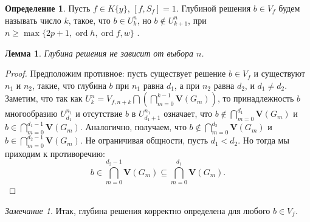 \documentclass[16pt]{article}
\DeclareMathOperator{\ord}{ord}
\renewcommand{\ge}{\geqslant} %
\theoremstyle{plain1}
\newtheorem{lemma}[theorem1]{Лемма}
\theoremstyle{plain2}
\theoremstyle{plain}
\theoremstyle{plain3}
\theoremstyle{definition}
\newtheorem{definition}[theorem2]{Определение}
\theoremstyle{remark}
\newtheorem{remark}[theorem1]{Замечание}
\begin{document}
\begin{definition}
Пусть $f\in K\{y\}$, $[f,S_f]=1$.  Глубиной решения $b\in {V}_f$  будем называть число $k$, такое, что $b\in {U}_k^n$, но $b\not\in {U}_{k+1}^n$, при $n \ge\max\{ 2p+1,\ord{h},\ord{f},w\}$ .
\end{definition}



\begin{lemma}\label{lemma:o_nasledovanii}
Глубина решения не зависит от выбора $n$.

\end{lemma}

\begin{proof}
Предположим противное: пусть существует решение $b\in{V}_f$ и существуют $n_1$ и $n_2$, такие, что глубина $b$ при $n_1$ равна $d_1$, а при $n_2$ равна $d_2$, и $d_1\not=d_2$. Заметим, что так как ${U}_k^n={V}_{f,n+k}\bigcap\left(\bigcap\limits_{m=0}^{k-1}\mathbf{V}\left(G_m\right)\right)$, то принадлежность $b$  многообразию ${U}_{d_1}^{n_1}$ и отсутствие $b$ в ${U}_{d_1+1}^{n_1}$ означает, что $b\not\in\bigcap\limits_{m=0}^{d_1}\mathbf{V}\left(G_m\right)$ и $b\in\bigcap\limits_{m=0}^{d_1-1}\mathbf{V}\left(G_m\right)$. Аналогично, получаем, что $b\not\in\bigcap\limits_{m=0}^{d_2}\mathbf{V}\left(G_m\right)$ и $b\in\bigcap\limits_{m=0}^{d_2-1}\mathbf{V}\left(G_m\right)$. Не ограничивая общности, пусть $d_1<d_2$. Но тогда мы приходим к противоречию: 
$$
b\in\bigcap\limits_{m=0}^{d_2-1}\mathbf{V}\left(G_m\right)\subseteq\bigcap\limits_{m=0}^{d_1}\mathbf{V}\left(G_m\right).
$$
\end{proof}

\begin{remark}\label{remark:o_sushestvovanii_gllubiny} Итак, глубина решения корректно определена для любого $b\in {V}_f$.
\end{remark}
\end{document}
